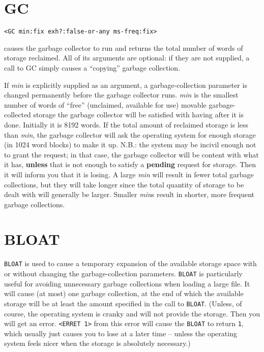 \documentclass[a4paper]{scrbook}
\begin{document}
\section{GC}\label{gc-1}

\begin{verbatim}
<GC min:fix exh?:false-or-any ms-freq:fix>
\end{verbatim}

 causes the garbage collector to run and returns the total number of words of storage reclaimed.
All of its arguments are optional: if they are not supplied, a call to GC simply causes a ``copying'' garbage collection.

If \emph{min} is explicitly supplied as an argument, a garbage-collection parameter is changed permanently before the
garbage collector runs. \emph{min} is the smallest number of words of ``free'' (unclaimed, available for use) movable
garbage-collected storage the garbage collector will be satisfied with having after it is done. Initially it is 8192 words.
If the total amount of reclaimed storage is less than \emph{min}, the garbage collector will ask the operating system for
enough storage (in 1024 word blocks) to make it up. N.B.: the system may be incivil enough not to grant the request; in
that case, the garbage collector will be content with what it has, \textbf{unless} that is not enough to satisfy a
\textbf{pending} request for storage. Then it will inform you that it is losing. A large \emph{min} will result in fewer
total garbage collections, but they will take longer since the total quantity of storage to be dealt with will generally be
larger. Smaller \emph{min}s result in shorter, more frequent garbage collections.

\section{BLOAT}\label{bloat}

\texttt{BLOAT} is used to cause a temporary expansion of the available storage space with or
without changing the garbage-collection parameters. \texttt{BLOAT} is particularly useful for avoiding unnecessary garbage
collections when loading a large file. It will cause (at most) one garbage collection, at the end of which the available
storage will be at least the amount specified in the call to \texttt{BLOAT}. (Unless, of course, the operating system is
cranky and will not provide the storage. Then you will get an error. \texttt{\textless{}ERRET\ 1\textgreater{}} from this
error will cause the \texttt{BLOAT} to return \texttt{1}, which usually just causes you to lose at a later time -- unless
the operating system feels nicer when the storage is absolutely necessary.)
\end{document}
